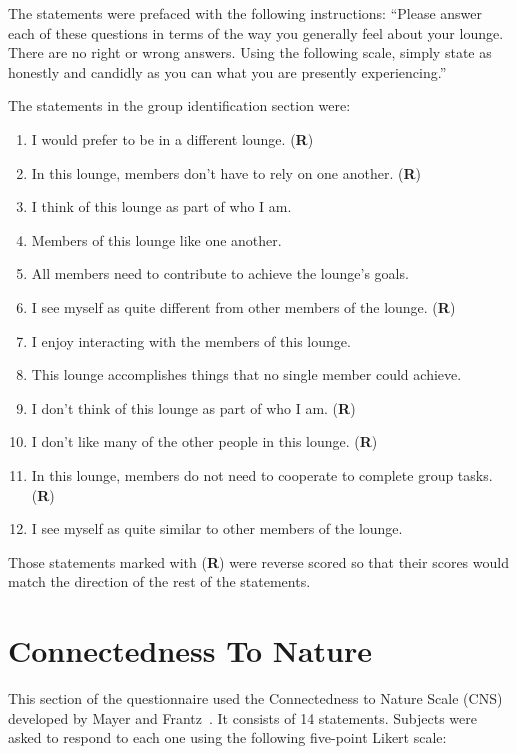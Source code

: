 The statements were prefaced with the following instructions: ``Please answer each of these questions in terms of the way you generally feel about your lounge. There are no right or wrong answers. Using the following scale, simply state as honestly and candidly as you can what you are presently experiencing.''

The statements in the group identification section were:

\begin{enumerate}
	\item I would prefer to be in a different lounge. (\textbf{R})
	\item In this lounge, members don't have to rely on one another. (\textbf{R})
	\item I think of this lounge as part of who I am.
	\item Members of this lounge like one another.
	\item All members need to contribute to achieve the lounge's goals.
	\item I see myself as quite different from other members of the lounge. (\textbf{R})
	\item I enjoy interacting with the members of this lounge.
	\item This lounge accomplishes things that no single member could achieve.
	\item I don't think of this lounge as part of who I am. (\textbf{R})
	\item I don't like many of the other people in this lounge. (\textbf{R})
	\item In this lounge, members do not need to cooperate to complete group tasks. (\textbf{R})
	\item I see myself as quite similar to other members of the lounge.
\end{enumerate}

Those statements marked with (\textbf{R}) were reverse scored so that their scores would match the direction of the rest of the statements.


\section{Connectedness To Nature}
\label{cns-items}

This section of the questionnaire used the Connectedness to Nature Scale (CNS) developed by Mayer and Frantz~\cite{MayerFrantz2004}. It consists of 14 statements. Subjects were asked to respond to each one using the following five-point Likert scale:

